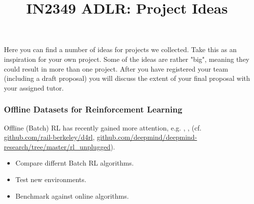 \documentclass[a4paper]{article}
\title{IN2349 ADLR: Project Ideas}
\author{}
\begin{document}
\maketitle

Here you can find a number of ideas for projects we collected. 
Take this as an inspiration for your own project. 
Some of the ideas are rather "big", meaning they could result in more than one project. 
After you have registered your team (including a draft proposal) you will discuss the extent of your final proposal with your assigned tutor.



\subsubsection{Offline Datasets for Reinforcement Learning}
Offline (Batch) RL has recently gained more attention, e.g. \cite{Agarwal2019}, \cite{nair2020}, \cite{AWOpt2021} (cf. \url{github.com/rail-berkeley/d4rl}, \url{github.com/deepmind/deepmind-research/tree/master/rl_unplugged}).
\begin{itemize}
  \item Compare differnt Batch RL algorithms.
  \item Test new environments.
  \item Benchmark against online algorithms.
\end{itemize}
\end{document}
